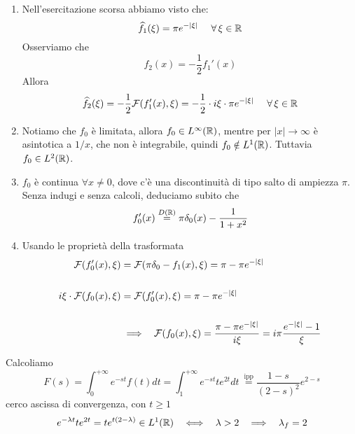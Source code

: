 \begin{enumerate}
\item Nell'esercitazione scorsa abbiamo visto che:\begin{equation*}
\hat{f}_{1}(\xi) = \pi e^{ - | \xi | } \ \ \ \ \forall \xi \in \RR 
\end{equation*}Osserviamo che\begin{equation*}
f_{2}(x) = - \frac{1}{2} f_{1} '(x)
\end{equation*}Allora\begin{equation*}
\hat{f}_{2}(\xi) = - \frac{1}{2}\Fc (f_{1} '(x) ,\xi) = - \frac{1}{2} \cdot i\xi \cdot \pi e^{ - | \xi | } \ \ \ \ \forall \xi \in \RR 
\end{equation*}
\item Notiamo che $f_{0}$ è limitata, allora $f_{0} \in L^{\infty }(\mathbb{R})$, mentre per $| x| \rightarrow \infty $ è asintotica a $1/x$, che non è integrabile, quindi $f_{0} \notin L^{1}(\mathbb{R})$. Tuttavia $f_{0} \in L^{2}(\mathbb{R})$.
\item $f_{0}$ è continua $\forall x\neq 0$, dove c'è una discontinuità di tipo salto di ampiezza $\pi $. Senza indugi e senza calcoli, deduciamo subito che\begin{equation*}
f_{0} '(x)\overset{D(\mathbb{R})}{ = } \pi \delta _{0}(x) - \frac{1}{1 + x^{2}}
\end{equation*}
\item Usando le proprietà della trasformata\begin{align*}
\mathcal{F} (f_{0} '(x) ,\xi) & = \mathcal{F} (\pi \delta _{0} - f_{1}(x) ,\xi) = \pi - \pi e^{ - | \xi | }\\
 & \\
i\xi \cdot\mathcal{F} (f_{0}(x) ,\xi) & = \mathcal{F} (f_{0} '(x) ,\xi) = \pi - \pi e^{ - | \xi | }\\
 & \\
 & \implies \ \ \mathcal{F} (f_{0}(x) ,\xi) = \frac{\pi - \pi e^{ - | \xi | }}{i\xi } = i\pi \frac{e^{ - | \xi | } - 1}{\xi }
\end{align*}
\end{enumerate}
\Soluzione

Calcoliamo
\begin{equation*}
F(s) = \int ^{ + \infty }_{0} e^{ - st} f(t) dt = \int ^{ + \infty }_{1} e^{ - st} te^{2t} dt\ \overset{\text{ipp}}{ = }\frac{1 - s}{(2 - s)^{2}} e^{2 - s}
\end{equation*}
cerco ascissa di convergenza, con $t\geqslant 1$
\begin{equation*}
e^{ - \lambda t} te^{2t} = te^{t(2 - \lambda)} \in L^{1}(\RR) \ \ \iff \ \ \lambda  > 2\ \ \implies \ \ \lambda _{f} = 2
\end{equation*}
\Soluzione

